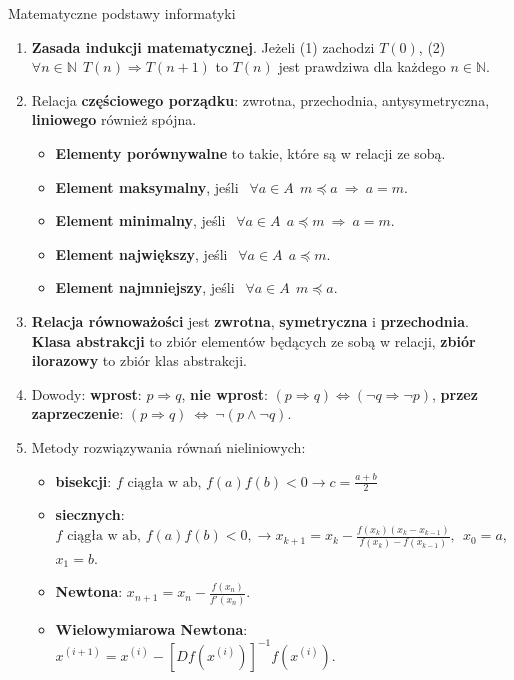 \documentclass[12pt]{article}
\begin{document}
    \begin{center}{\LARGE Matematyczne podstawy informatyki}\end{center}

    \begin{enumerate}
        \item \textbf{Zasada indukcji matematycznej}.
        Jeżeli (1) zachodzi $T(0)$, (2) $\forall n \in \mathbb{N} ~~ T(n) \Rightarrow T(n+1)$
        to $T(n)$ jest prawdziwa dla każdego $n \in \mathbb{N}$.

        \item Relacja \textbf{częściowego porządku}: zwrotna, przechodnia, antysymetryczna, \textbf{liniowego} również
        spójna.
        \begin{itemize}[noitemsep]
            \item \textbf{Elementy porównywalne} to takie, które są w relacji ze sobą.
            \item \textbf{Element maksymalny}, jeśli $~~ \forall a \in A ~~ m \preceq a ~ \Rightarrow  ~ a = m$.
            \item \textbf{Element minimalny}, jeśli $~~ \forall a \in A ~~ a \preceq m ~ \Rightarrow  ~ a = m$.
            \item \textbf{Element największy}, jeśli $~~ \forall a \in A ~~ a \preceq m$.
            \item \textbf{Element najmniejszy}, jeśli $~~ \forall a \in A ~~ m \preceq a$.
        \end{itemize}

        \item \textbf{Relacja równoważości} jest \textbf{zwrotna}, \textbf{symetryczna} i \textbf{przechodnia}.
        \textbf{Klasa abstrakcji} to zbiór elementów będących ze sobą w relacji, \textbf{zbiór ilorazowy} to zbiór
        klas abstrakcji.

        \item Dowody: \textbf{wprost}:  $ p \Rightarrow q$, \textbf{nie wprost}:  $(p \Rightarrow q) \Leftrightarrow (\neg q \Rightarrow \neg p)$,
        \textbf{przez zaprzeczenie}: $(p \Rightarrow q) ~ \Leftrightarrow ~ \neg(p \wedge \neg q)$.

        \item Metody rozwiązywania równań nieliniowych:
        \begin{itemize}[noitemsep]
            \item \textbf{bisekcji}: $f \text{ ciągła w ab, } f(a)f(b)<0 \rightarrow c = \frac{a+b}{2}$
            \item \textbf{siecznych}: $f  \text{ ciągła w ab, } f(a)f(b)<0, \rightarrow
            x_{k+1} = x_k - \frac{f(x_k)(x_k - x_{k-1})}{f(x_k) - f(x_{k-1})}, ~~ x_0 = a$, $x_1 = b$.
            \item \textbf{Newtona}: $x_{n+1} = x_n - \frac{f(x_n)}{f'(x_n)}$.
            \item \textbf{Wielowymiarowa Newtona}: $x^{(i+1)} = x^{(i)} - [Df(x^{(i)})]^{-1} f(x^{(i)})$.
        \end{itemize}


\end{enumerate}
\end{document}
